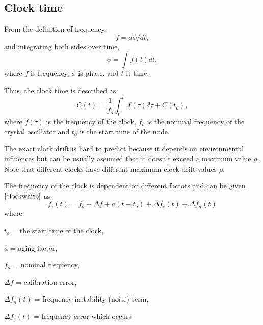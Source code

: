 \documentclass[journal]{IEEEtran}
\begin{document}
\subsection{\textbf{Clock time}}
From the definition of frequency:
\begin{equation}
f = d\phi/dt \label{freq_defn} ,
\end{equation}
and integrating both sides over time,
 \begin{equation}
\phi =\int f(t)dt ,
 \end{equation}
where $f$ is frequency, $\phi$ is phase, and $t$ is time.\par
Thus, the clock time is described as
\begin{equation}
C(t) = \frac{1}{f_o}\int_{t_o}^{t} {f(\tau)d\tau} + C(t_o) ,
\label{clock}
\end{equation}
where $f(\tau)$ is the frequency of the clock, $f_o$ is the nominal frequency of the crystal oscillator and $t_o$ is the start time of the node. \par The exact clock drift is hard to predict because it depends on environmental influences but can be usually assumed that it doesn't exceed a maximum value $\rho$. %
Note that different clocks have different maximum clock drift values $\rho$.\par The frequency of the clock is dependent on different
factors and can be given$\cite{clockwhite}$ as
\begin{equation}
f_i(t) = f_o + \Delta f + a(t-t_o) + \Delta
f_e(t) + \Delta f_n(t) \label{frequency}
\end{equation}
where \par $t_o$ = the start time of the clock, \par $a$ = aging factor,  \par $f_o$ = nominal frequency, \par $\Delta
f$ = calibration error,\par $\Delta f_n(t)$ = frequency instability (noise) term, \par $\Delta f_e(t)$ = frequency error which occurs
\end{document}
